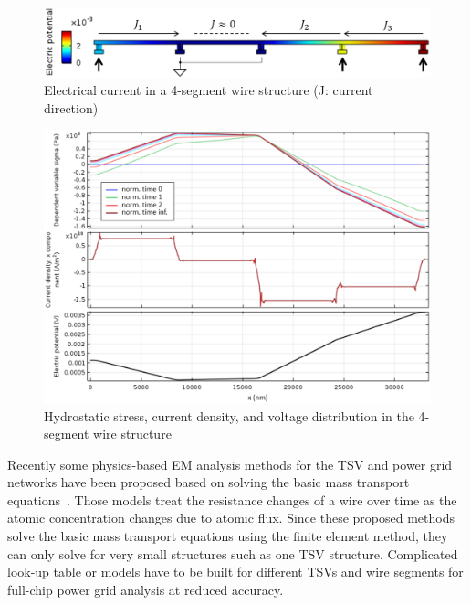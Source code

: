 \begin{figure}[h]
\centering
\includegraphics[width=0.95\columnwidth]{4seg_demo}
\caption{Electrical current in a 4-segment wire structure (J: current direction)}
\label{fig:4seg-demo}
\end{figure}

\begin{figure}[h]
\centering
\includegraphics[width=0.95\columnwidth]{4seg_multiplot}
\caption{Hydrostatic stress, current density, and voltage distribution in the 4-segment wire structure}
\label{fig:4seg-multiplot}
\end{figure}


Recently some physics-based EM analysis methods for the
TSV and power grid networks have been proposed based on solving the
basic mass transport
equations~\cite{Pak:2011cx,Pathak:2011kz,Zhao:2013cv,Pak:2013bh}.
Those models treat the resistance changes of a wire over time as the
atomic concentration changes due to atomic flux. Since these proposed
methods solve the basic mass transport equations using the finite
element method, they can only solve for very small structures such as
one TSV structure. Complicated look-up table or models have to be
built for different TSVs and wire segments for full-chip power grid
analysis at reduced accuracy.

